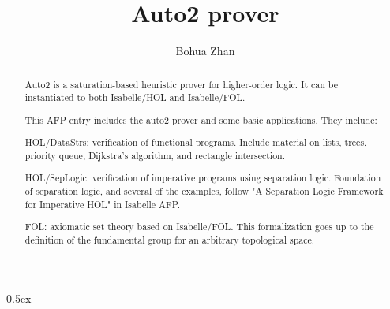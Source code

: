 \documentclass[11pt,a4paper]{article}
\begin{document}
\title{Auto2 prover}
\author{Bohua Zhan}
\maketitle

\begin{abstract}
  Auto2 is a saturation-based heuristic prover for higher-order
  logic. It can be instantiated to both Isabelle/HOL and Isabelle/FOL.

  This AFP entry includes the auto2 prover and some basic
  applications. They include:

  HOL/DataStrs: verification of functional programs. Include material
  on lists, trees, priority queue, Dijkstra's algorithm, and rectangle
  intersection.

  HOL/SepLogic: verification of imperative programs using separation
  logic. Foundation of separation logic, and several of the examples,
  follow "A Separation Logic Framework for Imperative HOL" in Isabelle
  AFP.

  FOL: axiomatic set theory based on Isabelle/FOL. This formalization
  goes up to the definition of the fundamental group for an arbitrary
  topological space.
\end{abstract}

\newpage
\tableofcontents
\newpage
\parindent 0pt\parskip 0.5ex





\end{document}
